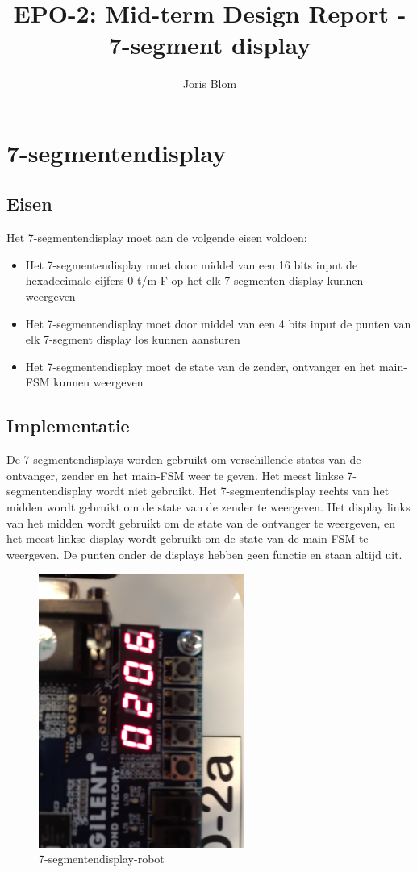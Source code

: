 \documentclass{report}
\title{EPO-2: Mid-term Design Report - 7-segment display}
\author{Joris Blom}
\begin{document}
\chapter{7-segmentendisplay}
\label{ch:sseg}
\section{Eisen}
\label{sec:Eisen}
Het 7-segmentendisplay moet aan de volgende eisen voldoen: 
\begin{itemize}
\item Het 7-segmentendisplay moet door middel van een 16 bits input de hexadecimale cijfers 0 t/m F op het elk 7-segmenten-display kunnen weergeven
\item Het 7-segmentendisplay moet door middel van een 4 bits input de punten van elk 7-segment display los kunnen aansturen
\item Het 7-segmentendisplay moet de state van de zender, ontvanger en het main-FSM kunnen weergeven
\end{itemize}

\section{Implementatie}
De 7-segmentendisplays worden gebruikt om verschillende states van de ontvanger, zender en het main-FSM weer te geven.
Het meest linkse 7-segmentendisplay wordt niet gebruikt.
Het 7-segmentendisplay rechts van het midden wordt gebruikt om de state van de zender te weergeven.
Het display links van het midden wordt gebruikt om de state van de ontvanger te weergeven, en het meest linkse display wordt gebruikt om de state van de main-FSM te weergeven.
De punten onder de displays hebben geen functie en staan altijd uit.

\begin{figure}[H]
\centering
\includegraphics[width=0.6\textwidth]{7_segment_display-robot.jpg}

\caption{7-segmentendisplay-robot}
\end{figure}
\end{document}
